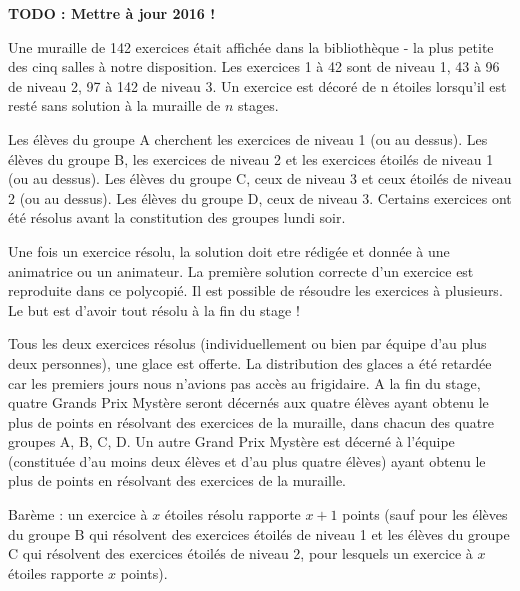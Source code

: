 \textbf{TODO : Mettre à jour 2016 !}

Une muraille de 142 exercices était affichée dans la bibliothèque - la plus petite des cinq salles à notre disposition. Les exercices 1 à 42 sont de niveau 1, 43 à 96 de niveau 2, 97 à 142 de niveau 3. Un exercice est décoré de n étoiles lorsqu'il est resté sans solution à la muraille de $n$ stages.

Les élèves du groupe A cherchent les exercices de niveau 1 (ou au dessus). Les élèves du groupe B, les exercices de niveau 2 et les exercices étoilés de niveau 1 (ou au dessus). Les élèves du groupe C, ceux de niveau 3 et ceux étoilés de niveau 2 (ou au dessus). Les élèves du groupe D, ceux de niveau 3. Certains exercices ont été résolus avant la constitution des groupes lundi soir.

Une fois un exercice résolu, la solution doit etre rédigée et donnée à une animatrice ou un animateur. La première solution correcte d'un exercice est reproduite dans ce polycopié. Il est possible de résoudre les exercices à plusieurs. Le but est d'avoir tout résolu à la fin du stage !

Tous les deux exercices résolus (individuellement ou bien par équipe d'au plus deux personnes), une glace est offerte. La distribution des glaces a été retardée car les premiers jours nous n'avions pas accès au frigidaire. A la fin du stage, quatre Grands Prix Mystère seront décernés aux quatre élèves ayant obtenu le plus de points en résolvant des exercices de la muraille, dans chacun des quatre groupes A, B, C, D. Un autre Grand Prix Mystère est décerné à l'équipe (constituée d'au moins deux élèves et d'au plus quatre élèves) ayant obtenu le plus de points en résolvant des exercices de la muraille.

Barème : un exercice à $x$ étoiles résolu rapporte $x+1$ points (sauf pour les élèves du groupe B qui résolvent des exercices étoilés de niveau 1 et les élèves du groupe C qui résolvent des exercices étoilés de niveau 2, pour lesquels un exercice à $x$ étoiles rapporte $x$ points).

